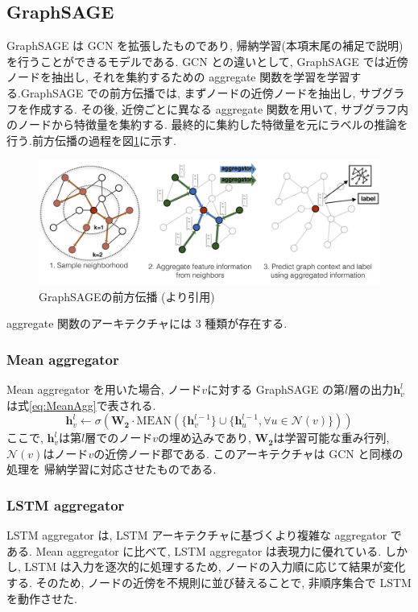 \documentclass[a4j,twoside,12pt,dvipdfmx]{thesis} %
\begin{document}
\subsection{GraphSAGE}
GraphSAGE は GCN を拡張したものであり, 帰納学習(本項末尾の補足で説明)を行うことができるモデルである. GCN との違いとして, GraphSAGE では近傍ノードを抽出し, それを集約するための aggregate 関数を学習を学習する.GraphSAGE での前方伝播では, まずノードの近傍ノードを抽出し, サブグラフを作成する.
その後, 近傍ごとに異なる aggregate 関数を用いて, サブグラフ内のノードから特徴量を集約する.
最終的に集約した特徴量を元にラベルの推論を行う.前方伝播の過程を図\ref{fig:SAGE}に示す.

\begin{figure}
  \centering
  \includegraphics[width=\linewidth]
  {img/GraphSAGE.png}
  \caption{GraphSAGEの前方伝播 (\cite{hamilton2017inductive}より引用)}
  \label{fig:SAGE}
\end{figure}

aggregate 関数のアーキテクチャには 3 種類が存在する.
\subsubsection{Mean aggregator}
Mean aggregator を用いた場合, ノード$v$に対する GraphSAGE の第$l$層の出力$\mathbf{h}_{v}^{l}$は式\ref{eq:MeanAgg}で表される.
\begin{equation}
  \label{eq:MeanAgg}
  \mathbf{h}_{v}^{l} \leftarrow \sigma(\mathbf{W_{2}} \cdot \mathrm{MEAN} (\{ \mathbf{h}_{v}^{l-1}\} \cup \{ \mathbf{h}_{u}^{l-1} , \forall u \in \mathcal{N}(v) \}))
\end{equation}
ここで, $\mathbf{h}_{v}^{l}$は第$l$層でのノード$v$の埋め込みであり, $\mathbf{W_{2}}$は学習可能な重み行列, $\mathcal{N}(v)$はノード$v$の近傍ノード郡である.
このアーキテクチャは GCN と同様の処理を 帰納学習に対応させたものである.

\subsubsection{LSTM aggregator}
LSTM aggregator は, LSTM アーキテクチャに基づくより複雑な aggregator である. Mean aggregator に比べて, LSTM aggregator は表現力に優れている. しかし, LSTM は入力を逐次的に処理するため, ノードの入力順に応じて結果が変化する. そのため, ノードの近傍を不規則に並び替えることで, 非順序集合で LSTM を動作させた.
\end{document}
